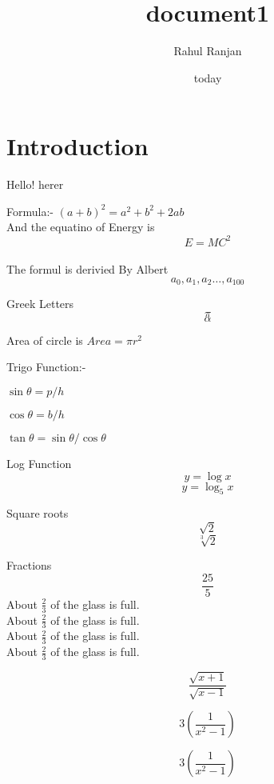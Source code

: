 \documentclass{article}
\title{document1}
\author{Rahul Ranjan}
\date{today}
\begin{document}
\maketitle

\section{Introduction}
Hello! herer 

Formula:- ${(a+b)^2 = a^2+b^2+2ab}$\\
And the equatino of Energy is $${E = MC^2}$$\\
The formul is derivied By Albert
$$a_0,a_1,a_2\ldots,a_{100}$$

Greek Letters
$$\pi$$
$$\alpha$$

Area of circle is $Area = \pi r^2$


Trigo Function:-

$ \sin \theta = p/h$

$\cos \theta = b/h$

$\tan \theta = \sin \theta / \cos \theta$

Log Function
$$ y = \log x$$
$$y = \log_5 x$$

Square roots
$$\sqrt{2}$$
$$\sqrt[3]{2}$$

Fractions
$$\frac{25}{5}$$
About $\frac{2}{3}$ of the glass is full.\\
About $\frac{2}{3}$ of the glass is full.\\[6pt]
About $\frac{2}{3}$ of the glass is full.\\[6pt]
About $\frac{2}{3}$ of the glass is full.

$$\frac{\sqrt{x+1}}{\sqrt{x-1}}$$

$$3\left( \frac{1}{x^2-1}\right) $$

$$3(\frac{1}{x^2-1}) $$
\end{document}
